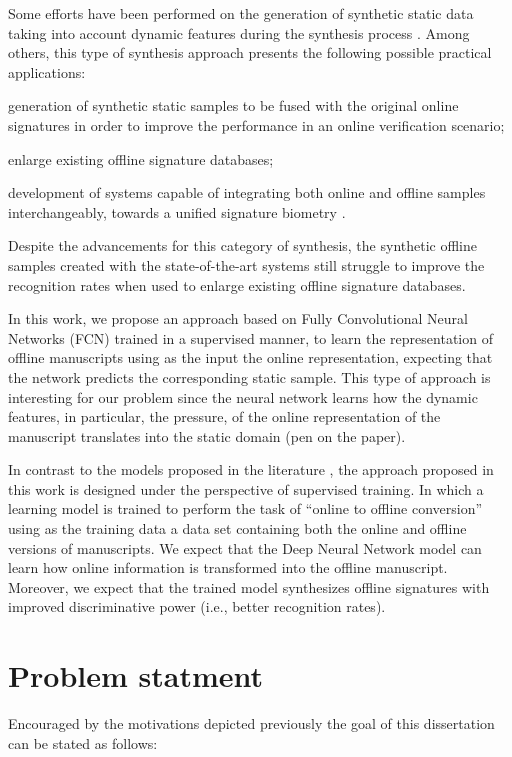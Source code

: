 Some efforts have been performed on the generation of synthetic static data taking into account dynamic features during the synthesis process \cite{diaz2014generation}. Among others, this type of synthesis approach presents the following possible practical applications:
\begin{inlinelist}
  \item generation of synthetic static samples to be fused with the original online signatures in order to improve the performance in an online verification scenario;
  \item enlarge existing offline signature databases;
  \item development of systems capable of integrating both online and offline samples interchangeably, towards a unified signature biometry \cite{chapter}.
\end{inlinelist}

Despite the advancements for this category of synthesis, the synthetic offline samples created with the state-of-the-art systems still struggle to improve the recognition rates when used to enlarge existing offline signature databases.


In this work, we propose an approach based on Fully Convolutional Neural Networks (FCN) trained in a supervised manner, to learn the representation of offline manuscripts using as the input the online representation, expecting that the network predicts the corresponding static sample. This type of approach is interesting for our problem since the neural network learns how the dynamic features, in particular, the pressure, of the online representation of the manuscript translates into the static domain (pen on the paper). 

In contrast to the models proposed in the literature \cite{ferrer2013synthetic, ferrer2013realistic, diaz2014generation}, the approach proposed in this work is designed under the perspective of supervised training. In which a learning model is trained to perform the task of ``online to offline conversion'' using as the training data a data set containing both the online and offline versions of manuscripts. We expect that the Deep Neural Network model can learn how online information is transformed into the offline manuscript. Moreover, we expect that the trained model synthesizes offline signatures with improved discriminative power (i.e., better recognition rates). 

\section{Problem statment}
Encouraged by the motivations depicted previously the goal of this dissertation can be stated as follows:

